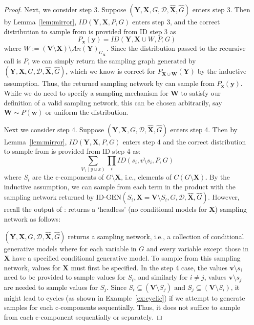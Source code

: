\documentclass{article}
\newcommand{\red}{\textcolor{red}}
\newcommand{\x}{\mathbf{x}}
\newcommand{\y}{\mathbf{y}}
\newcommand{\X}{\mathbf{X}}
\newcommand{\Xp}{{\hat{\mathbf{X}}}}
\newcommand{\Gp}{{\hat{{G}}}}
\newcommand{\Y}{\mathbf{Y}}
\newcommand{\V}{\mathbf{V}}
\newcommand{\vb}{\mathbf{v}}
\newcommand{\mbf}{\mathbf}
\newcommand{\data}{\mathcal{D}}
\newcommand{\idgen}{\text{ID-GEN}\xspace}
\newcommand{\idgenpar}{\idgen$(\mathbf{Y}, \mathbf{X},  G,  \data, {\Xp}, \Gp)$\xspace}
\theoremstyle{plain}
\theoremstyle{definition}
\theoremstyle{remark}
\begin{document}
\begin{proof}
		Next, we consider step 3. Suppose \idgenpar enters step 3. Then by Lemma~\ref{lem:mirror}, $ID(\Y, \X, P, G)$ enters step 3, and the correct distribution to sample from is provided from ID step 3 as
		\[
		P_{\x}(\y) = ID(\Y, \X\cup W, P, G)
		\]
		where $W:= (\V\setminus \X)\setminus An(\Y)_{G_{\overline{\X}}}$. Since the distribution passed to the recursive call is $P$, we can simply return the sampling graph generated by \idgenpar, which we know is correct for $P_{\X\cup \mbf{W}}(\Y)$ by the inductive assumption.
		Thus, the returned sampling network by \idgen can sample from $P_{\x}(\y)$.
		While we do need to specify a sampling mechanism for $\mbf{W}$ to satisfy our definition of a valid sampling network, this can be chosen arbitrarily, say $\mbf{W}\sim P(\mbf{w})$ or uniform the distribution. 
		
		
		Next we consider step 4. Suppose \idgenpar enters step 4. Then by Lemma~\ref{lem:mirror}, $ID(\Y,\X, P, G)$ enters step 4 and the correct distribution to sample from is provided from ID step 4 as:
		\[
		\sum_{V\setminus(y\cup x)}\prod_i ID(s_i, v\setminus s_i, P, G)
		\]
		where $S_i$ are the c-components of $G\setminus \X$, i.e., elements of $C(G\setminus \X)$. By the inductive assumption, we can sample from each term in the product with the sampling network returned by $\idgen(S_{i}, \mathbf{X}=\mathbf{V} \setminus S_{i}, G, \data, {\Xp}, \Gp)$. However, recall the output of \idgen: \idgen returns a `headless' (no conditional models for $\X$) sampling network as follows: %
		
		\idgenpar returns a sampling network, i.e., a collection of conditional generative models where for each variable in $G$ and every variable %
		except those in $\X$ have a specified conditional generative model. To sample from this sampling network, values for $\X$ must first be specified. In the step 4 case, the values $\vb \setminus s_i$ need to be provided to sample values for $S_i$, and similarly for $i\neq j$, values $\vb \setminus s_j$ are needed to sample values for $S_j$. Since $S_i\subseteq (\V \setminus S_j)$ and $S_j\subseteq (\V \setminus S_i)$, it might lead to cycles (as shown in Example~\ref{ex:cyclic})
  if we attempt to generate samples for each c-components sequentially.
  Thus, it does not suffice to sample from each c-component sequentially or separately.
		

\end{proof}
\end{document}

